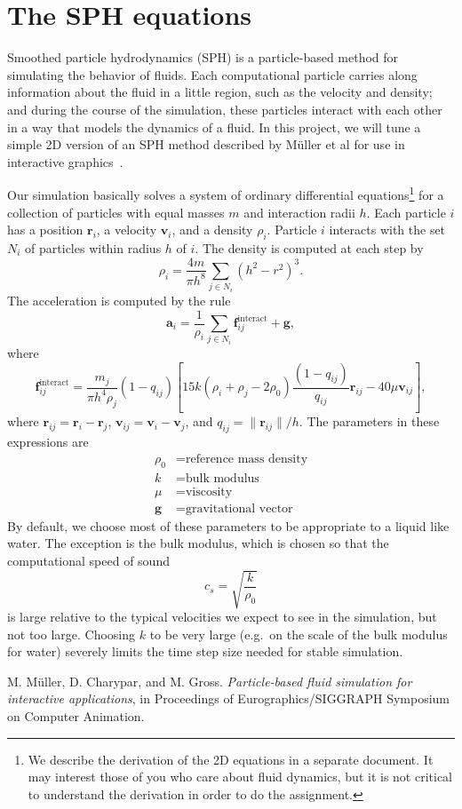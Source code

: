 \documentclass[10pt, leqno]{article} %
\newcommand{\bfr}{\mathbf{r}}
\newcommand{\bfv}{\mathbf{v}}
\newcommand{\bfa}{\mathbf{a}}
\newcommand{\bff}{\mathbf{f}}
\newcommand{\bfg}{\mathbf{g}}
\begin{document}
\pagestyle{fancy}
\fancyfoot{}

\section{The SPH equations}

Smoothed particle hydrodynamics (SPH) is a particle-based method for
simulating the behavior of fluids.  Each computational particle
carries along information about the fluid in a little region, such as
the velocity and density; and during the course of the simulation,
these particles interact with each other in a way that models the
dynamics of a fluid.  In this project, we will tune a simple 2D version of an
SPH method described by M\"uller et al for use in interactive
graphics~\cite{muller}.

Our simulation basically solves a system of ordinary differential
equations\footnote{%
  We describe the derivation of the 2D equations in a separate document.
  It may interest those of you who care about fluid dynamics, but it is
  not critical to understand the derivation in order to do the assignment.
}
for a collection of particles with equal masses $m$ and
interaction radii $h$.  Each particle $i$ has a position $\bfr_i$,
a velocity $\bfv_i$, and a density $\rho_i$.  Particle $i$ interacts
with the set $N_i$ of particles within radius $h$ of $i$.
The density is computed at each step by
\[
  \rho_i = \frac{4m}{\pi h^8} \sum_{j \in N_i} (h^2 - r^2)^3.
\]
The acceleration is computed by the rule
\[
  \bfa_i = \frac{1}{\rho_i} \sum_{j \in N_i} \bff_{ij}^{\mathrm{interact}} + \bfg,
\]
where
\[
  \bff_{ij}^{\mathrm{interact}} =
  \frac{m_j}{\pi h^4 \rho_j} (1-q_{ij}) \left[
    15k (\rho_i + \rho_j - 2 \rho_0) \frac{(1-q_{ij})}{q_{ij}} \bfr_{ij} -
    40\mu \bfv_{ij}
  \right],
\]
where $\bfr_{ij} = \bfr_i-\bfr_j$, $\bfv_{ij} = \bfv_i-\bfv_j$,
and $q_{ij} = \|\bfr_{ij}\|/h$.  The parameters in these expressions are
\begin{align*}
  \rho_0 &= \mbox{reference mass density} \\
  k      &= \mbox{bulk modulus} \\
  \mu    &= \mbox{viscosity} \\
  \bfg   &= \mbox{gravitational vector}
\end{align*}
By default, we choose most of these parameters to be appropriate to a liquid
like water.  The exception is the bulk modulus, which is chosen so that the
computational speed of sound
\[
  c_s = \sqrt{\frac{k}{\rho_0}}
\]
is large relative to the typical velocities we expect to see in the
simulation, but not too large.  Choosing $k$ to be very large (e.g.~on
the scale of the bulk modulus for water) severely limits the time step
size needed for stable simulation.



\begin{thebibliography}{10}

{\sc M. M\"uller, D. Charypar, and M. Gross}.
{\em Particle-based fluid simulation for interactive applications},
in Proceedings of Eurographics/SIGGRAPH Symposium on Computer Animation.

\end{thebibliography}
\end{document}
